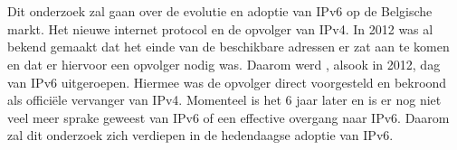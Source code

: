 
%
%

%



\chapter*{}


Dit onderzoek zal gaan over de evolutie en adoptie van IPv6 op de Belgische markt. Het nieuwe internet protocol en de opvolger van IPv4. In 2012 was al bekend gemaakt dat het einde van de beschikbare adressen er zat aan te komen en dat er hiervoor een opvolger nodig was. Daarom werd , alsook in 2012, dag van IPv6 uitgeroepen. Hiermee was de opvolger direct voorgesteld en bekroond als officiële vervanger van IPv4. Momenteel is het 6 jaar later en is er nog niet veel meer sprake geweest van IPv6 of een effective overgang naar IPv6. Daarom zal dit onderzoek zich verdiepen in de hedendaagse adoptie van IPv6.

